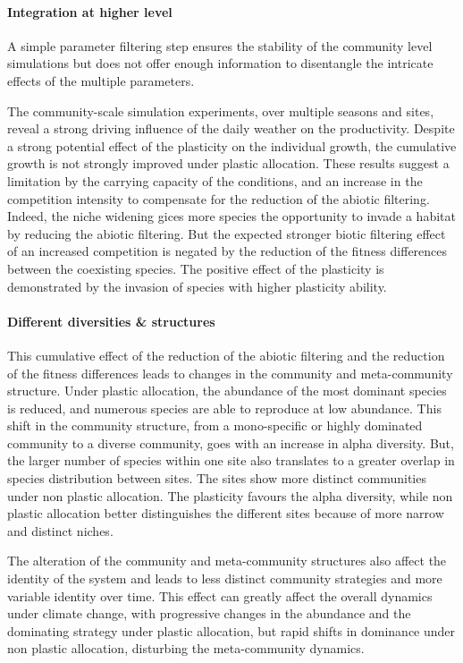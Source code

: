 \paragraph{Integration at higher level}

A simple parameter filtering step ensures the stability of the community level simulations but does not offer enough information to disentangle the intricate effects of the multiple parameters. 

The community-scale simulation experiments, over multiple seasons and sites, reveal a strong driving influence of the daily weather on the productivity. Despite a strong potential effect of the plasticity on the individual growth, the cumulative growth is not strongly improved under plastic allocation. These results suggest a limitation by the carrying capacity of the conditions, and an increase in the competition intensity to compensate for the reduction of the abiotic filtering. Indeed, the niche widening gices more species the opportunity to invade a habitat by reducing the abiotic filtering. But the expected stronger biotic filtering effect of an increased competition is negated by the reduction of the fitness differences between the coexisting species. The positive effect of the plasticity is demonstrated by the invasion of species with higher plasticity ability.


\paragraph{Different diversities \& structures}
This cumulative effect of the reduction of the abiotic filtering and the reduction of the fitness differences leads to changes in the community and meta-community structure. Under plastic allocation, the abundance of the most dominant species is reduced, and numerous species are able to reproduce at low abundance. This shift in the community structure, from a mono-specific or highly dominated community to a diverse community, goes with an increase in alpha diversity. But, the larger number of species within one site also translates to a greater overlap in species distribution between sites. The sites show more distinct communities under non plastic allocation. The plasticity favours the alpha diversity, while non plastic allocation better distinguishes the different sites because of more narrow and distinct niches.

The alteration of the community and meta-community structures also affect the identity of the system and leads to less distinct community strategies and more variable identity over time. This effect can greatly affect the overall dynamics under climate change, with progressive changes in the abundance and the dominating strategy under plastic allocation, but rapid shifts in dominance under non plastic allocation, disturbing the meta-community dynamics.


